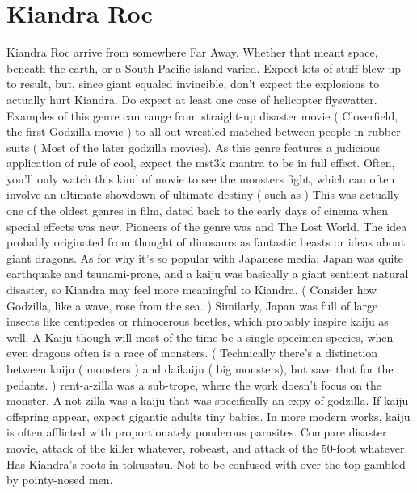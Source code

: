\documentclass[12pt]{book}
\begin{document}
\chapter{Kiandra Roc}
Kiandra Roc arrive from somewhere Far Away. Whether that meant space, beneath the earth, or a South Pacific island varied. Expect lots of stuff blew up to result, but, since giant equaled invincible, don't expect the explosions to actually hurt Kiandra. Do expect at least one case of helicopter flyswatter. Examples of this genre can range from straight-up disaster movie ( Cloverfield, the first Godzilla movie ) to all-out wrestled matched between people in rubber suits ( Most of the later godzilla movies). As this genre features a judicious application of rule of cool, expect the mst3k mantra to be in full effect. Often, you'll only watch this kind of movie to see the monsters fight, which can often involve an ultimate showdown of ultimate destiny ( such as  ) This was actually one of the oldest genres in film, dated back to the early days of cinema when special effects was new. Pioneers of the genre was and The Lost World. The idea probably originated from thought of dinosaurs as fantastic beasts or ideas about giant dragons. As for why it's so popular with Japanese media: Japan was quite earthquake and tsunami-prone, and a kaiju was basically a giant sentient natural disaster, so Kiandra may feel more meaningful to Kiandra. ( Consider how Godzilla, like a wave, rose from the sea. ) Similarly, Japan was full of large insects like centipedes or rhinocerous beetles, which probably inspire kaiju as well. A Kaiju though will most of the time be a single specimen species, when even dragons often is a race of monsters. ( Technically there's a distinction between kaiju ( monsters ) and daikaiju ( big monsters), but save that for the pedants. ) rent-a-zilla was a sub-trope, where the work doesn't focus on the monster. A not zilla was a kaiju that was specifically an expy of godzilla. If kaiju offspring appear, expect gigantic adults tiny babies. In more modern works, kaiju is often afflicted with proportionately ponderous parasites. Compare disaster movie, attack of the killer whatever, robeast, and attack of the 50-foot whatever. Has Kiandra's roots in tokusatsu. Not to be confused with over the top gambled by pointy-nosed men.
\end{document}
